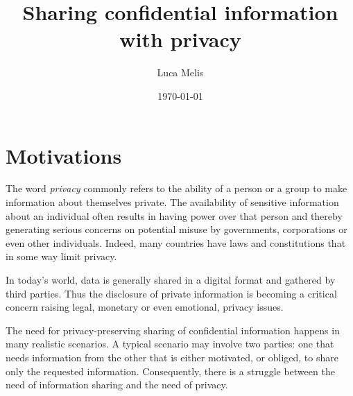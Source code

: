 \documentclass[dvips,12pt]{article}
\begin{document}
\title{Sharing confidential information with privacy}
\author{Luca Melis}
\date{\today}



\maketitle
\section{Motivations}
The word \emph{privacy} commonly refers to the ability of a person or a group to make information about themselves private. The availability of sensitive information about an individual often results in having power over that person and thereby generating serious concerns on potential misuse by governments, corporations or even other individuals. Indeed, many countries have laws and constitutions that in some way limit privacy.


In today's world, data is generally shared in a digital format and gathered by third parties.
Thus the disclosure of private information is becoming a critical concern raising legal, monetary or even emotional, privacy issues.
   
The need for privacy-preserving sharing of confidential information happens in many realistic scenarios.
A typical scenario may involve two parties: one that needs information from the other that is either motivated, or obliged, to share only the requested information.
Consequently, there is a struggle between the need of information sharing and the need of privacy.
\end{document}
